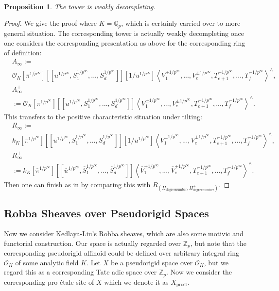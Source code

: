 \documentclass[11pt]{book}
\newtheorem{proposition}[theorem]{Proposition}
\theoremstyle{definition}
\numberwithin{equation}{section}
\begin{document}
\begin{proposition}
The tower is weakly decompleting.	
\end{proposition}


\begin{proof}
We give the proof where $K=\mathbb{Q}_p$, which is certainly carried over to more general situation. The corresponding tower is actually weakly decompleting once one considers the corresponding presentation as above for the corresponding ring of definition:
\begin{align}
&A_\infty:=\\
&\mathcal{O}_K[\pi^{1/p^\infty}][[u^{1/p^\infty},S_1^{1/p^\infty},...,S_d^{1/p^\infty}]][1/u^{1/p^\infty}]\left<V_1^{\pm 1/p^\infty},...,V_e^{\pm 1/p^\infty},T^{-1/p^\infty}_{e+1},...,T^{-1/p^\infty}_f\right>^\wedge,\\
&A_\infty^+\\
&:=\mathcal{O}_K[\pi^{1/p^\infty}][[u^{1/p^\infty},S_1^{1/p^\infty},...,S_d^{1/p^\infty}]]\left<V_1^{\pm 1/p^\infty},...,V_e^{\pm 1/p^\infty},T^{-1/p^\infty}_{e+1},...,T^{-1/p^\infty}_f\right>^\wedge.
\end{align}
This transfers to the positive characteristic situation under tilting:
\begin{align}
&R_\infty:=\\
&{k}_K[\overline{\pi}^{1/p^\infty}][[\overline{u}^{1/p^\infty},\overline{S}_1^{1/p^\infty},...,\overline{S}_d^{1/p^\infty}]][1/\overline{u}^{1/p^\infty}]\left<\overline{V}_1^{\pm 1/p^\infty},...,\overline{V}_e^{\pm 1/p^\infty},T^{-1/p^\infty}_{e+1},...,T^{-1/p^\infty}_f\right>^\wedge,\\
&R_\infty^+\\
&:={k}_K[\overline{\pi}^{1/p^\infty}][[\overline{u}^{1/p^\infty},\overline{S}_1^{1/p^\infty},...,\overline{S}_d^{1/p^\infty}]]\left<\overline{V}_1^{\pm 1/p^\infty},...,\overline{V}_e^{\pm 1/p^\infty},T^{-1/p^\infty}_{e+1},...,T^{-1/p^\infty}_f\right>^\wedge.
\end{align}	
Then one can finish as in \cite[Lemma 7.1.2]{12KL2} by comparing this with $R_{(H_\text{degreenumber},H_\text{degreenumber}^+)}$.
\end{proof}

\newpage
\subsection{Robba Sheaves over Pseudorigid Spaces}


\indent Now we consider Kedlaya-Liu's Robba sheaves, which are also some motivic and functorial construction. Our space is actually regarded over $\mathbb{Z}_p$, but note that the corresponding pseudorigid affinoid could be defined over arbitrary integral ring $\mathcal{O}_K$ of some analytic field $K$. Let $X$ be a pseudorigid space over $\mathcal{O}_K$, but we regard this as a corresponding Tate adic space over $\mathbb{Z}_p$. Now we consider the corresponding pro-\'etale site of $X$ which we denote it as $X_\text{pro\'et}$.
\end{document}
